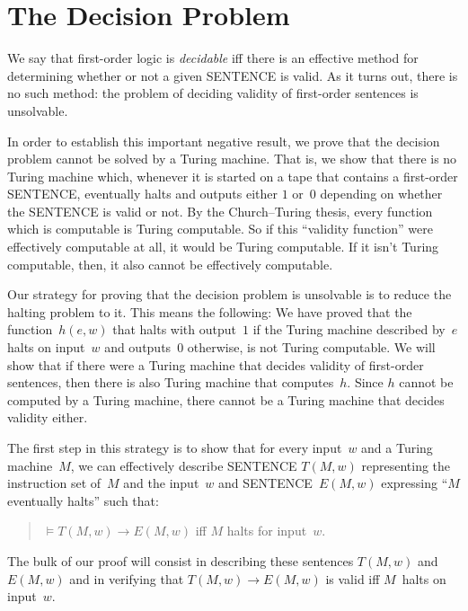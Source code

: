 \documentclass[10pt,a4paper]{article}
\newcommand*{\olup}[1]{\MakeUppercase{#1}}
\theoremstyle{plain}
\theoremstyle{definition}
\theoremstyle{remark}
\newcommand*{\olfileid}[3]{}
\newcommand*{\olsection}[1]{\section*{#1}}
\providecommand{\lif}{\mathbin{\rightarrow}}
\providecommand{\Entails}{\mathrel{\models}}
\begin{document}



\olfileid{tur}{und}{dec}
\olsection{The Decision Problem}

We say that first-order logic is \emph{decidable} iff there is an
effective method for determining whether or not a given \olup{sentence}
is valid. As it turns out, there is no such method: the problem of
deciding validity of first-order sentences is unsolvable.

In order to establish this important negative result, we prove that
the decision problem cannot be solved by a Turing machine.  That is,
we show that there is no Turing machine which, whenever it is started
on a tape that contains a first-order \olup{sentence}, eventually halts
and outputs either $1$ or~$0$ depending on whether the
\olup{sentence} is valid or not. By the Church--Turing thesis, every
function which is computable is Turing computable. So if this
``validity function'' were effectively computable at all, it would be
Turing computable. If it isn't Turing computable, then, it also cannot
be effectively computable.

Our strategy for proving that the decision problem is unsolvable is to
reduce the halting problem to it.  This means the following: We have
proved that the function~$h(e,w)$ that halts with output~$1$ if the
Turing machine described by~$e$ halts on input~$w$ and outputs~$0$
otherwise, is not Turing computable.  We will show that if there were
a Turing machine that decides validity of first-order sentences, then
there is also Turing machine that computes~$h$.  Since $h$ cannot be
computed by a Turing machine, there cannot be a Turing machine that
decides validity either.

The first step in this strategy is to show that for every input~$w$
and a Turing machine~$M$, we can effectively describe \olup{sentence}
$T(M, w)$ representing the instruction set of~$M$ and the input~$w$
and \olup{sentence}~$E(M, w)$ expressing ``$M$ eventually halts'' such
that:
\begin{quote}
  $\Entails T(M, w) \lif E(M,w)$ iff $M$ halts for input~$w$.
\end{quote}
The bulk of our proof will consist in describing these sentences
$T(M, w)$ and~$E(M, w)$ and in verifying that $T(M, w) \lif E(M, w)$
is valid iff $M$~halts on input~$w$.
\end{document}
